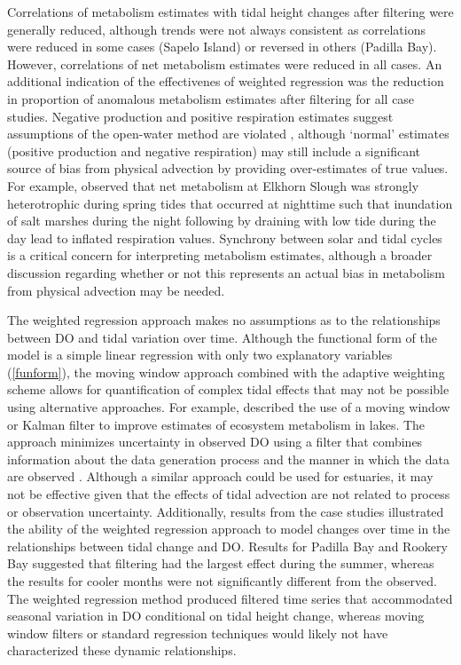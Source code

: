 \documentclass[letterpaper,12pt,oneside]{article}\usepackage[]{graphicx}\usepackage[]{color}
\begin{document}
Correlations of metabolism estimates with tidal height changes after filtering were generally reduced, although trends were not always consistent as correlations were reduced in some cases (Sapelo Island) or reversed in others (Padilla Bay).  However, correlations of net metabolism estimates were reduced in all cases.  An additional indication of the effectivenes of weighted regression was the reduction in proportion of anomalous metabolism estimates after filtering for all case studies.  Negative production and positive respiration estimates suggest assumptions of the open-water method are violated \citep{Needoba12}, although `normal' estimates (positive production and negative respiration) may still include a significant source of bias from physical advection by providing over-estimates of true values.  For example, \citet{Nidzieko14} observed that net metabolism at Elkhorn Slough was strongly heterotrophic during spring tides that occurred at nighttime such that inundation of salt marshes during the night following by draining with low tide during the day lead to inflated respiration values.   Synchrony between solar and tidal cycles is a critical concern for interpreting metabolism estimates, although a broader discussion regarding whether or not this represents an actual bias in metabolism from physical advection may be needed. 

The weighted regression approach makes no assumptions as to the relationships between \ac{DO} and tidal variation over time.  Although the functional form of the model is a simple linear regression with only two explanatory variables (\cref{funform}), the moving window approach combined with the adaptive weighting scheme allows for quantification of complex tidal effects that may not be possible using alternative approaches.  For example, \citet{Batt12} described the use of a moving window or Kalman filter to improve estimates of ecosystem metabolism in lakes.  The approach minimizes uncertainty in observed \ac{DO} using a filter that combines information about the data generation process and the manner in which the data are observed \citep{Harvey89}.  Although a similar approach could be used for estuaries, it may not be effective given that the effects of tidal advection are not related to process or observation uncertainty.  Additionally, results from the case studies illustrated the ability of the weighted regression approach to model changes over time in the relationships between tidal change and \ac{DO}.  Results for Padilla Bay and Rookery Bay suggested that filtering had the largest effect during the summer, whereas the results for cooler months were not significantly different from the observed.  The weighted regression method produced filtered time series that accommodated seasonal variation in \ac{DO} conditional on tidal height change, whereas moving window filters or standard regression techniques would likely not have characterized these dynamic relationships.
\end{document}
